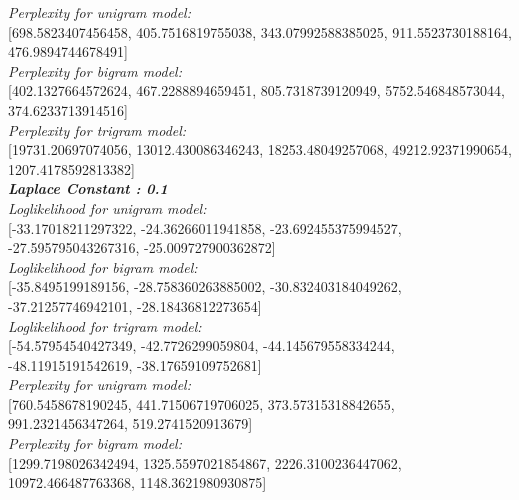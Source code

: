 \documentclass[11ppt]{article}
\begin{document}
\textit{Perplexity for unigram model:} \\ \vspace{1mm}  [698.5823407456458, 405.7516819755038, 343.07992588385025, 911.5523730188164, 476.9894744678491]  \\ \vspace{2mm}
\textit{Perplexity for bigram model:} \\ \vspace{1mm}  [402.1327664572624, 467.2288894659451, 805.7318739120949, 5752.546848573044, 374.6233713914516]  \\ \vspace{2mm}
\textit{Perplexity for trigram model:} \\ \vspace{1mm}  [19731.20697074056, 13012.430086346243, 18253.48049257068, 49212.92371990654, 1207.4178592813382]  \\ \vspace{2mm}
\textit{\textbf{Laplace Constant : 0.1 }}\\ \vspace{2mm}
\textit{Loglikelihood for unigram model:} \\ \vspace{1mm}  [-33.17018211297322, -24.36266011941858, -23.692455375994527, -27.595795043267316, -25.009727900362872]  \\ \vspace{2mm}
\textit{Loglikelihood for bigram model:} \\ \vspace{1mm}  [-35.8495199189156, -28.758360263885002, -30.832403184049262, -37.21257746942101, -28.18436812273654]  \\ \vspace{2mm}
\textit{Loglikelihood for trigram model:} \\ \vspace{1mm}  [-54.57954540427349, -42.7726299059804, -44.145679558334244, -48.11915191542619, -38.17659109752681]  \\ \vspace{2mm}
\textit{Perplexity for unigram model:} \\ \vspace{1mm}  [760.5458678190245, 441.71506719706025, 373.57315318842655, 991.2321456347264, 519.2741520913679]  \\ \vspace{2mm}
\textit{Perplexity for bigram model:} \\ \vspace{1mm}  [1299.7198026342494, 1325.5597021854867, 2226.3100236447062, 10972.466487763368, 1148.3621980930875]  \\ \vspace{2mm}
\end{document}
